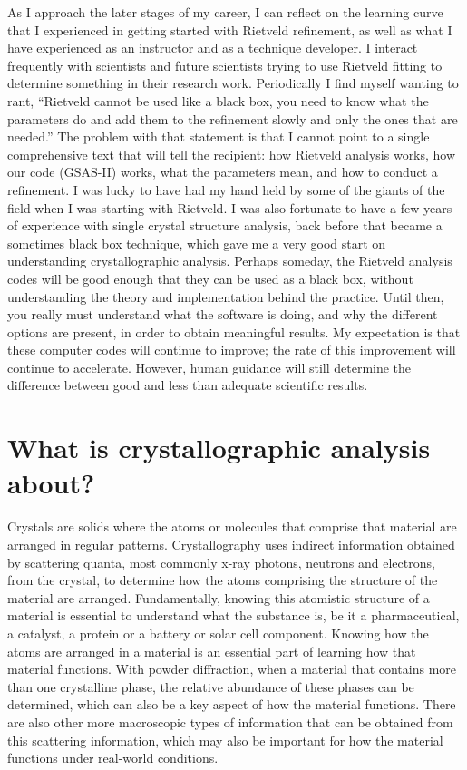  As I approach the later stages of my career, I can reflect on the learning curve that I experienced in getting started with Rietveld refinement, as well as what I have experienced as an instructor and as a technique developer. 
 I interact frequently with scientists and future scientists trying to use Rietveld fitting to determine something in their research work. Periodically I find myself wanting to rant, ``Rietveld cannot be used like a black box, you need to know what the parameters do and add them to the refinement slowly and only the ones that are needed.''
 The problem with that statement is that I cannot point to a single comprehensive text that will tell the recipient: how Rietveld analysis works, how our code (GSAS-II) works, what the parameters mean, and how to conduct a refinement. 
 I was lucky to have had my hand held by some of the giants of the field when I was starting with Rietveld. I was also fortunate to have a few years of experience with single crystal structure analysis, back before that became a sometimes black box technique, which gave me a very good start on understanding crystallographic analysis. 
 Perhaps someday, the Rietveld analysis codes will be good enough that they can be used as a black box, without understanding the theory and implementation behind the practice. 
 Until then, you really must understand what the software is doing, and why the different options are present, in order to obtain meaningful results. 
 My expectation is that these computer codes will continue to improve; the rate of this improvement will continue to accelerate. However, human guidance will still determine the difference between good and less than adequate scientific results.

\section*{What is crystallographic analysis about?}

 Crystals are solids where the atoms or molecules that comprise that material are arranged in regular patterns. Crystallography uses indirect information obtained by scattering quanta, most commonly x-ray photons, neutrons and electrons, from the crystal, to determine how the atoms comprising the structure of the material are arranged. Fundamentally, knowing this atomistic structure of a material is essential to understand what the substance is, be it a pharmaceutical, a catalyst, a protein or a battery or solar cell component. Knowing how the atoms are arranged in a material is an essential part of learning how that material functions. With powder diffraction, when a material that contains more than one crystalline phase, the relative abundance of these phases can be determined, which can also be a key aspect of how the material functions. There are also other more macroscopic types of information that can be obtained from this scattering information, which may also be important for how the material functions under real-world conditions. 

